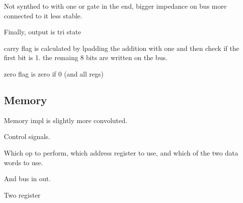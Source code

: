 Not synthed to with one or gate in the end, bigger impedance on bus more connected to it less stable. 

Finally, output is tri state  

carry flag is calculated by lpadding the addition with one and then check if the first bit is 1. the remaing 8 bits are written on the bus. 

zero flag is zero if 0 (and all regs)


% 

\subsection{Memory}

Memory impl is slightly more convoluted. 

Control signals. 

Which op to perform, which address register to use, and which of the two data words to use. 

And bus in out. 

Two register

